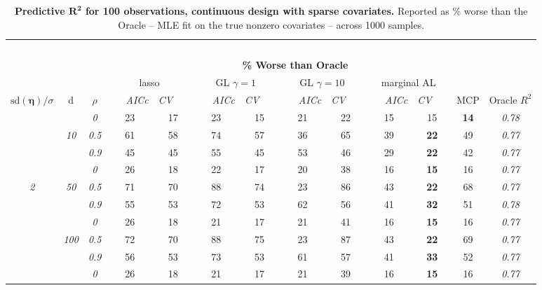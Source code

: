\clearpage
\begin{table}
\vspace{-.2cm}
\footnotesize
\caption{ 
	{\bf  Predictive $\boldsymbol{R^2}$ for 100 observations, 
	continuous design with sparse covariates.}
  Reported as  \% worse than the Oracle 
  -- MLE fit on the true nonzero covariates -- 
  across 1000 samples.}
\begin{center}
\begin{tabular}{ccc|cc|cc|cc|cc|c|c}
\hline &&&\multicolumn{9}{|c|}{~}\\[-1ex]
\multicolumn{3}{c}{~}&\multicolumn{9}{|c|}{\bf \% Worse than Oracle } &   \\[1ex]
& &
& \multicolumn{2}{c}{lasso} 
& \multicolumn{2}{c}{GL $\gamma=1$} 
& \multicolumn{2}{c}{GL $\gamma=10$} 
& \multicolumn{2}{c}{marginal AL} 
& \multicolumn{1}{c|}{~} & \\[-0.5ex]
$\mathrm{sd}(\boldsymbol{\eta})/\sigma$ & {\sf d} & $\rho$ 
& ~~~\scriptsize\it AICc & \multicolumn{1}{c}{\scriptsize\it CV~~~}
& ~~~\scriptsize\it AICc & \multicolumn{1}{c}{\scriptsize\it CV~~~}
& ~~~\scriptsize\it AICc & \multicolumn{1}{c}{\scriptsize\it CV~~~}
& ~~~\scriptsize\it AICc & \multicolumn{1}{c}{\scriptsize\it CV~~~} 
& \multicolumn{1}{c|}{ MCP} & Oracle $R^2$ \\[.5ex]
\hline\rule{0pt}{3ex}
& & \it  0  & 23 & 17 & 23 & 15 & 21 & 22 & 15 & 15 & {\bf 14} & \it  0.78 \\
 & \it  10  & \it  0.5  & 61 & 58 & 74 & 57 & 36 & 65 & 39 & {\bf 22} & 49 & \it  0.77 \\
& & \it  0.9  & 45 & 45 & 55 & 45 & 53 & 46 & 29 & {\bf 22} & 42 & \it  0.77 \\[1ex]
\cline{2-3}\rule{0pt}{3ex}
& & \it  0  & 26 & 18 & 22 & 17 & 20 & 38 & 16 & {\bf 15} & 16 & \it  0.77 \\
\it  2  & \it  50  & \it  0.5  & 71 & 70 & 88 & 74 & 23 & 86 & 43 & {\bf 22} & 68 & \it  0.77 \\
& & \it  0.9  & 55 & 53 & 72 & 53 & 62 & 56 & 41 & {\bf 32} & 51 & \it  0.78 \\[1ex]
\cline{2-3}\rule{0pt}{3ex}
& & \it  0  & 26 & 18 & 21 & 17 & 21 & 41 & 16 & {\bf 15} & 16 & \it  0.77 \\
 & \it  100  & \it  0.5  & 72 & 70 & 88 & 75 & 23 & 87 & 43 & {\bf 22} & 69 & \it  0.77 \\
& & \it  0.9  & 56 & 53 & 73 & 53 & 61 & 57 & 41 & {\bf 33} & 52 & \it  0.77 \\[1ex]
\cline{2-3}\rule{0pt}{3ex}
& & \it  0  & 26 & 18 & 21 & 17 & 21 & 39 & 16 & {\bf 15} & 16 & \it  0.77 \\

\end{tabular}
\end{center}
\end{table}
